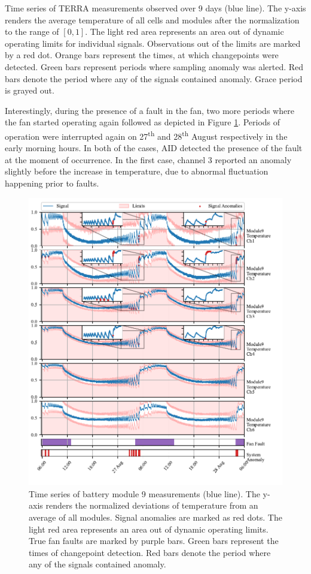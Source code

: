 Time series of TERRA measurements observed over 9 days (blue line). The y-axis renders the average temperature of all cells and modules after the normalization to the range of $[0, 1]$. The light red area represents an area out of dynamic operating limits for individual signals. Observations out of the limits are marked by a red dot. Orange bars represent the times, at which changepoints were detected. Green bars represent periods where sampling anomaly was alerted. Red bars denote the period where any of the signals contained anomaly. Grace period is grayed out.

Interestingly, during the presence of a fault in the fan, two more periods where the fan started operating again followed as depicted in Figure \ref{fig:kokam_second}. Periods of operation were interrupted again on 27\textsuperscript{th} and 28\textsuperscript{th} August respectively in the early morning hours. In both of the cases, AID detected the presence of the fault at the moment of occurrence. In the first case, channel 3 reported an anomaly slightly before the increase in temperature, due to abnormal fluctuation happening prior to faults.

\begin{figure}[htbp]
 \centerline{\includegraphics{figures/Kokam_thresh_second_zoom.pdf}}
 \caption{Time series of battery module 9 measurements (blue line). The y-axis renders the normalized deviations of temperature from an average of all modules. Signal anomalies are marked as red dots. The light red area represents an area out of dynamic operating limits. True fan faults are marked by purple bars. Green bars represent the times of changepoint detection. Red bars denote the period where any of the signals contained anomaly.}
 \label{fig:kokam_second}
\end{figure}

